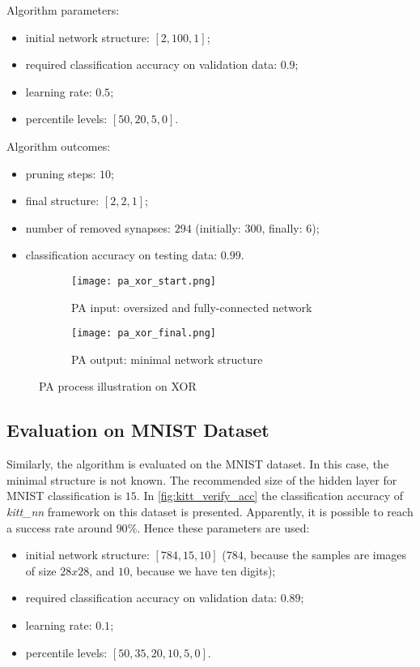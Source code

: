 Algorithm parameters:
\begin{itemize}
\item initial network structure: $ [2, 100, 1] $;
\item required classification accuracy on validation data: $ 0.9 $;
\item learning rate: $ 0.5 $;
\item percentile levels: $ [50, 20, 5, 0] $.
\end{itemize}

Algorithm outcomes:
\begin{itemize}
\item pruning steps: $ 10 $;
\item final structure: $ [2, 2, 1] $;
\item number of removed synapses: $ 294 $ (initially: $ 300 $, finally: $ 6 $);
\item classification accuracy on testing data: $ 0.99 $.
\end{itemize}

\begin{figure}[H]
\centering
\begin{subfigure}{0.4\textwidth}
  \centering
  \texttt{[image: pa\_xor\_start.png]}
  \caption{PA input: oversized and fully-connected network}
  \label{img:pa_xor_start}
\end{subfigure}%
\begin{subfigure}{0.4\textwidth}
  \centering
  \texttt{[image: pa\_xor\_final.png]}
  \caption{PA output: minimal network structure}
  \label{img:pa_xor_final}
\end{subfigure}
\caption{PA process illustration on XOR}
\label{img:pa_xor_morph}
\end{figure}

\subsection{Evaluation on MNIST Dataset} \label{ssec:evaluation_on_mnist}
Similarly, the algorithm is evaluated on the MNIST dataset. In this case, the minimal structure is not known. The recommended size of the hidden layer for MNIST classification is $ 15 $. In \cref{fig:kitt_verify_acc} the classification accuracy of \textit{kitt\_nn} framework on this dataset is presented. Apparently, it is possible to reach a success rate around $ 90\% $. Hence these parameters are used:

\begin{itemize}
\item initial network structure: $ [784, 15, 10] $ ($ 784 $, because the samples are images of size $ 28x28 $, and $ 10 $, because we have ten digits);
\item required classification accuracy on validation data: $ 0.89 $;
\item learning rate: $ 0.1 $;
\item percentile levels: $ [50, 35, 20, 10, 5, 0] $.
\end{itemize}

